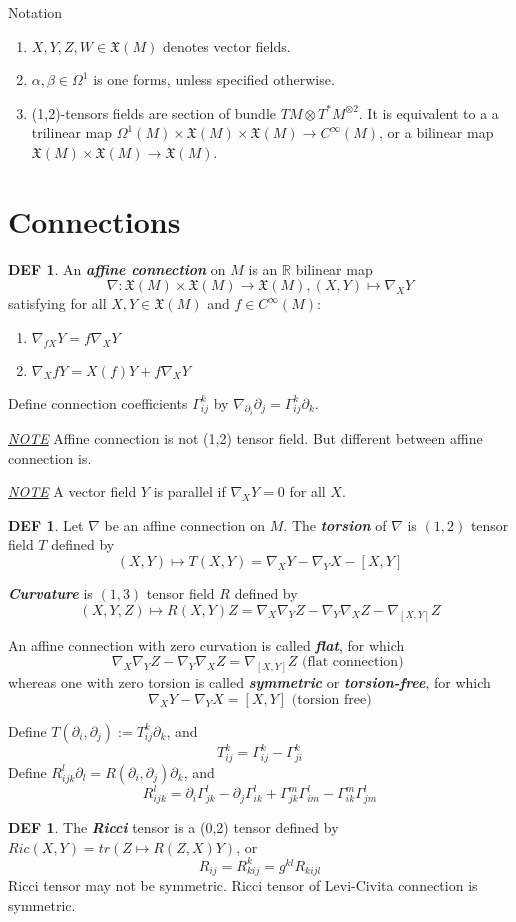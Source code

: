 \documentclass[twocolumn]{article}
\renewcommand{\emph}[1]{\textbf{\textit{#1}}}
\newcommand{\X}{\mathfrak{X}}
\newcommand{\n}{\nabla}
\newcommand{\R}{\mathbb{R}}
\newcommand{\C}{C^{\infty}}
\newcommand{\p}{\partial}
\newcommand{\G}{\Gamma}
\newcommand{\N}{\textit{\underline{NOTE} }}
\newcommand{\W}{\Omega}
\newcommand{\ot}{\otimes}
\theoremstyle{definition}
\newtheorem{defi}[thm]{DEF}
\begin{document}
\begin{fdefi}{Notation}{}
	\begin{enumerate}
		\item $X, Y, Z, W \in \X(M)$ denotes vector fields. 
		\item $\alpha, \beta \in \W^1$ is one forms, unless specified otherwise.
		\item (1,2)-tensors fields are section of bundle $TM \otimes T^{*}M^{\ot 2}$. 
		It is equivalent to a a trilinear map $\W^1(M) \times \X(M) \times \X(M) \rightarrow C^{\infty}(M)$, or a bilinear map $\X(M) \times \X(M) \to \X(M)$.
	\end{enumerate}
\end{fdefi}

\hrulefill
\section{Connections}

\begin{defi}
	An \emph{affine connection} on $M$ is an $\R$ bilinear map 
	$$
		\n: \X (M) \times \X(M) \to \X (M), (X,Y) \mapsto \n_X Y
	$$
	satisfying for all $X, Y \in \X(M)$ and $f \in \C(M)$: 
	\begin{enumerate}
		\item $\n_{fX} Y = f \n_X Y$
		\item $\n_{X} fY = X(f) Y + f \n_X Y$
	\end{enumerate}

	Define connection coefficients $\G^k_{ij}$ by $\n_{\p_i}\p_j = \G_{ij}^k \p_k$.
\end{defi}
\N Affine connection is not (1,2) tensor field. But different between affine connection is.

\N A vector field $Y$ is parallel if $\n_X Y = 0$ for all $X$.

\begin{defi}
	Let $\n$ be an affine connection on $M$.
	The \emph{torsion} of $\n$ is $(1,2)$ tensor field $T$ defined by
	$$
	(X, Y) \mapsto T(X, Y) = \n_X Y - \n_Y X - [X, Y]
	$$
	
	\emph{Curvature} is $(1,3)$ tensor field $R$ defined by
	$$
	(X,Y,Z) \mapsto R(X, Y)Z = \n_X \n_Y Z - \n_Y \n_X Z - \n_{[X, Y]} Z
	$$

	An affine connection with zero curvation is called \emph{flat}, for which
	$$
		\n_X \n_Y Z-  \n_Y \n_X Z = \n_{[X, Y]} Z \text{ (flat connection) }
	$$
	whereas one with zero torsion is called \emph{symmetric} or \emph{torsion-free}, for which
	$$
	\n_X Y - \n_Y X = [X, Y] \text{ (torsion free)}
	$$

	Define $ T(\p_i, \p_j) := T_{ij}^k \p_k$, and 
	$$T_{ij}^k = \G_{ij}^k - \G_{ji}^k$$
	Define $R_{ijk}^l \p_l = R(\p_i, \p_j)\p_k$, and 
	$$R_{ijk}^l = \p_i \G_{jk}^l - \p_j \G_{ik}^l + \G_{jk}^m\G_{im}^l - \G_{ik}^m \G_{jm}^l$$
\end{defi}
\begin{defi}
	The \emph{Ricci} tensor is a (0,2) tensor defined by $Ric(X,Y) = tr(Z \mapsto R(Z,X)Y)$, or 
	$$
	R_{ij} = R_{kij}^k = g^{kl} R_{kijl}
	$$
	Ricci tensor may not be symmetric. 
	Ricci tensor of Levi-Civita connection is symmetric.
\end{defi}
\end{document}

